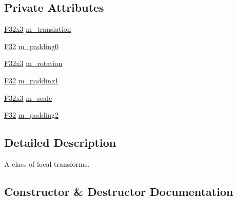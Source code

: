 \subsection*{Private Attributes}
\begin{DoxyCompactItemize}
\item 
\hyperlink{namespacemage_a73fbe0da4b8d5bc156bb8453e5b63a17}{F32x3} \hyperlink{classmage_1_1_local_transform_af467d4a331c7215cf016e31bd91c42db}{m\+\_\+translation}
\item 
\hyperlink{namespacemage_aa97e833b45f06d60a0a9c4fc22ae02c0}{F32} \hyperlink{classmage_1_1_local_transform_a408d86574aca8976ca123b992118c6f8}{m\+\_\+padding0}
\item 
\hyperlink{namespacemage_a73fbe0da4b8d5bc156bb8453e5b63a17}{F32x3} \hyperlink{classmage_1_1_local_transform_ac4825a600646e0bb3db5a4699db5f5e1}{m\+\_\+rotation}
\item 
\hyperlink{namespacemage_aa97e833b45f06d60a0a9c4fc22ae02c0}{F32} \hyperlink{classmage_1_1_local_transform_a3b2b212788e819fb6ac46322c15e002e}{m\+\_\+padding1}
\item 
\hyperlink{namespacemage_a73fbe0da4b8d5bc156bb8453e5b63a17}{F32x3} \hyperlink{classmage_1_1_local_transform_aca17d055c29e408606e199425bd2ee2a}{m\+\_\+scale}
\item 
\hyperlink{namespacemage_aa97e833b45f06d60a0a9c4fc22ae02c0}{F32} \hyperlink{classmage_1_1_local_transform_ad293dda4a1c7bfec90267915937aec90}{m\+\_\+padding2}
\end{DoxyCompactItemize}


\subsection{Detailed Description}
A class of local transforms. 

\subsection{Constructor \& Destructor Documentation}
\hypertarget{classmage_1_1_local_transform_a1d16baf92877d4b62e519a574a288c5a}{}\label{classmage_1_1_local_transform_a1d16baf92877d4b62e519a574a288c5a} 
